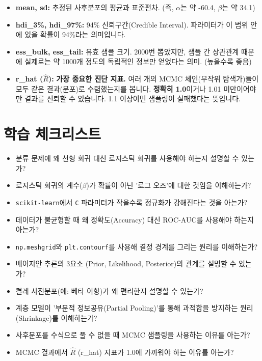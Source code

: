 \documentclass[11pt,a4paper]{book}
\theoremstyle{definition}
\begin{document}
\begin{itemize}
    \item \textbf{mean, sd:} 추정된 사후분포의 평균과 표준편차. (즉, $\alpha$는 약 -60.4, $\beta$는 약 34.1)
    \item \textbf{hdi\_3\%, hdi\_97\%:} 94\% 신뢰구간(Credible Interval). 파라미터가 이 범위 안에 있을 확률이 94\%라는 의미입니다.
    \item \textbf{ess\_bulk, ess\_tail:} 유효 샘플 크기. 2000번 뽑았지만, 샘플 간 상관관계 때문에 실제로는 약 1000개 정도의 독립적인 정보만 얻었다는 의미. (높을수록 좋음)
    \item \textbf{r\_hat ($\hat{R}$):} \textbf{가장 중요한 진단 지표.} 여러 개의 MCMC 체인(무작위 탐색가)들이 모두 같은 결과(분포)로 수렴했는지를 봅니다. \textbf{정확히 1.0}이거나 1.01 미만이어야만 결과를 신뢰할 수 있습니다. 1.1 이상이면 샘플링이 실패했다는 뜻입니다.
\end{itemize}


\section{학습 체크리스트}

\begin{itemize}
    \item[\textendash] 분류 문제에 왜 선형 회귀 대신 로지스틱 회귀를 사용해야 하는지 설명할 수 있는가?
    \item[\textendash] 로지스틱 회귀의 계수($\beta$)가 확률이 아닌 '로그 오즈'에 대한 것임을 이해하는가?
    \item[\textendash] \texttt{scikit-learn}에서 \texttt{C} 파라미터가 작을수록 정규화가 강해진다는 것을 아는가?
    \item[\textendash] 데이터가 불균형할 때 왜 정확도(Accuracy) 대신 ROC-AUC를 사용해야 하는지 아는가?
    \item[\textendash] \texttt{np.meshgrid}와 \texttt{plt.contourf}를 사용해 결정 경계를 그리는 원리를 이해하는가?
    \item[\textendash] 베이지안 추론의 3요소 (Prior, Likelihood, Posterior)의 관계를 설명할 수 있는가?
    \item[\textendash] 켤레 사전분포(예: 베타-이항)가 왜 편리한지 설명할 수 있는가?
    \item[\textendash] 계층 모델이 '부분적 정보공유(Partial Pooling)'를 통해 과적합을 방지하는 원리(Shrinkage)를 이해하는가?
    \item[\textendash] 사후분포를 수식으로 풀 수 없을 때 MCMC 샘플링을 사용하는 이유를 아는가?
    \item[\textendash] MCMC 결과에서 $\hat{R}$ (r\_hat) 지표가 1.0에 가까워야 하는 이유를 아는가?
\end{itemize}
\end{document}
